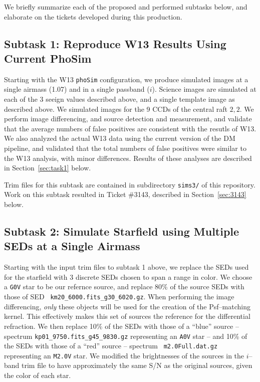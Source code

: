 \documentclass[prd, nofootinbib, floatfix, 11pt, tightenlines, times]{article}
\begin{document}
We briefly summarize each of the proposed and performed subtasks
below, and elaborate on the tickets developed during this production.

\subsection{Subtask 1: Reproduce W13 Results Using Current PhoSim}

Starting with the W13 {\tt phoSim} configuration, we produce simulated
images at a single airmass (1.07) and in a single passband ($i$).
Science images are simulated at each of the 3 seeign values described
above, and a single template image as described above.  We simulated
images for the 9 CCDs of the central raft $2,2$.  We perform image
differencing, and source detection and measurement, and validate that
the average numbers of false positives are consistent with the resutls
of W13.  We also analyzed the actual W13 data using the current
version of the DM pipeline, and validated that the total numbers of
false positives were similar to the W13 analysis, with minor
differences.  Results of these analyses are described in
Section~\ref{sec:task1} below.

Trim files for this subtask are contained in subdirectory {\tt sims3/}
of this repository.  Work on this subtask resulted in Ticket \#3143,
described in Section~\ref{sec:3143} below.

\subsection{Subtask 2: Simulate Starfield using Multiple SEDs at a Single Airmass}

Starting with the input trim files to subtask 1 above, we replace the
SEDs used for the starfield with 3 discrete SEDs chosen to span a
range in color.  We choose a {\tt G0V} star to be our refernce source,
and replace 80\% of the source SEDs with those of SED {\tt
  km20\_6000.fits\_g30\_6020.gz}.  When performing the image
differencing, {\it only} these objects will be used for the creation
of the Psf--matching kernel.  This effectively makes this set of
sources the reference for the differential refraction.  We then
replace 10\% of the SEDs with those of a ``blue'' source -- spectrum
{\tt kp01\_9750.fits\_g45\_9830.gz} representing an {\tt A0V} star --
and 10\% of the SEDs with those of a ``red'' source -- spectrum {\tt
  m2.0Full.dat.gz} representing an {\tt M2.0V} star.  We modified the
brightnesses of the sources in the $i$--band trim file to have
approximately the same S/N as the original sources, given the color of
each star.
\end{document}
